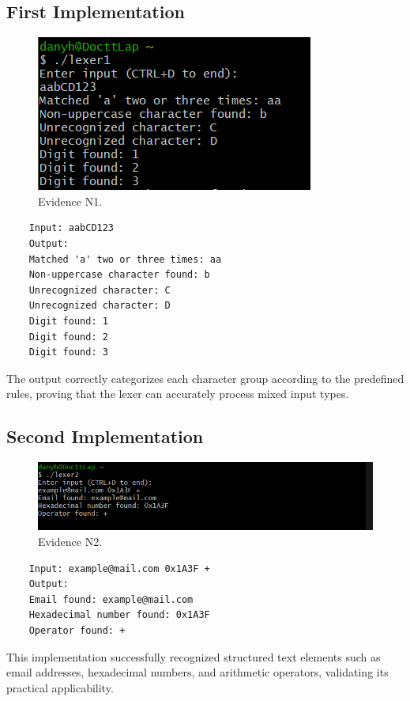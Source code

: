 \documentclass[a4paper,11pt]{scrarticle}
\begin{document}
    \subsection{First Implementation}
    \begin{figure}[h]
        \centering
        \includegraphics[width=0.75\linewidth]{R1.png}
        \caption{Evidence N1.}
    \end{figure}
    \begin{verbatim}
    Input: aabCD123
    Output:
    Matched 'a' two or three times: aa
    Non-uppercase character found: b
    Unrecognized character: C
    Unrecognized character: D
    Digit found: 1
    Digit found: 2
    Digit found: 3
    \end{verbatim}
    The output correctly categorizes each character group according to the predefined rules, proving that the lexer can accurately process mixed input types.

    \subsection{Second Implementation}
    \begin{figure}[h]
        \centering
        \includegraphics[width=0.75\linewidth]{R2.png}
        \caption{Evidence N2.}
    \end{figure}
    \begin{verbatim}
    Input: example@mail.com 0x1A3F +
    Output:
    Email found: example@mail.com
    Hexadecimal number found: 0x1A3F
    Operator found: +
    \end{verbatim}
    This implementation successfully recognized structured text elements such as email addresses, hexadecimal numbers, and arithmetic operators, validating its practical applicability.
\end{document}
